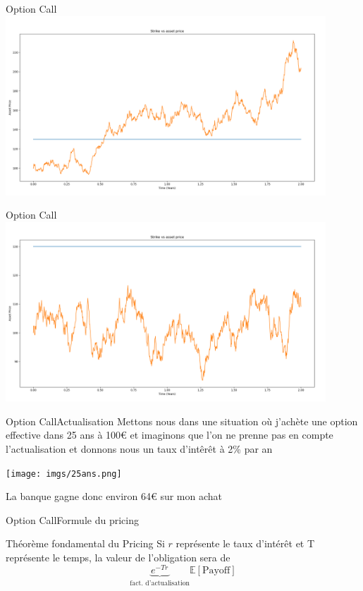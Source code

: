 \documentclass{beamer}
\newcommand{\1}{\mathmybb{1}}
\begin{document}
\begin{frame}{Option Call}
  \includegraphics[width=12cm]{imgs/strike.png}
\end{frame}
\begin{frame}{Option Call}
  \includegraphics[width=12cm]{imgs/nostrike.png}
\end{frame}
\begin{frame}{Option Call}{Actualisation}
  Mettons nous dans une situation où j'achète une option effective dans 25 ans à 100€ et imaginons que l'on ne prenne pas en compte l'actualisation et donnons nous un taux d'intêrêt à 2\% par an
  \pause
  \begin{center}
    \texttt{[image: imgs/25ans.png]}
    \end{center}
  La banque gagne donc environ 64€ sur mon achat
\end{frame}
\begin{frame}{Option Call}{Formule du pricing}
\begin{block}{Théorème fondamental du Pricing}
 Si $r$ représente le taux d'intérêt et T représente le temps, la valeur de l'obligation sera de
    \begin{equation} \label{tfp}
      \underbrace{e^{-Tr}}_{\text{fact. d'actualisation}}\mathbb{E}\left[ \text{Payoff} \right]
    \end{equation}
  \end{block}
\end{frame}
\end{document}

